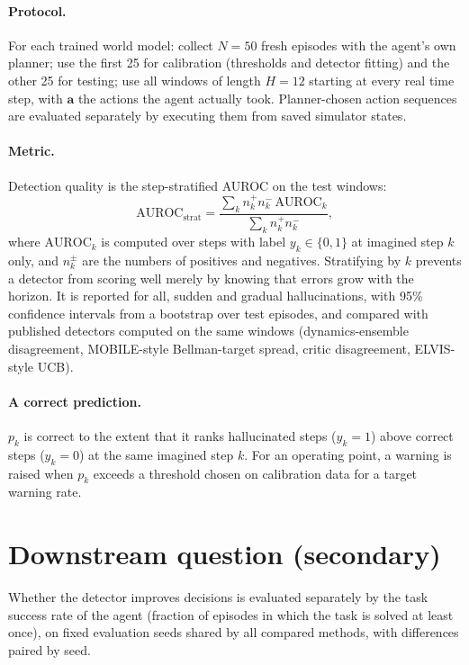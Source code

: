 \documentclass[11pt]{article}
\begin{document}
\paragraph{Protocol.}
For each trained world model: collect $N=50$ fresh episodes with the agent's own planner; use the first 25 for
calibration (thresholds and detector fitting) and the other 25 for testing; use all windows of length $H=12$
starting at every real time step, with $\mathbf a$ the actions the agent actually took. Planner-chosen action
sequences are evaluated separately by executing them from saved simulator states.

\paragraph{Metric.}
Detection quality is the step-stratified AUROC on the test windows:
\[
\text{AUROC}_{\text{strat}}=\frac{\sum_k n^+_k n^-_k\,\text{AUROC}_k}{\sum_k n^+_k n^-_k},
\]
where $\text{AUROC}_k$ is computed over steps with label $y_k\in\{0,1\}$ at imagined step $k$ only, and $n^\pm_k$
are the numbers of positives and negatives. Stratifying by $k$ prevents a detector from scoring well merely by
knowing that errors grow with the horizon. It is reported for all, sudden and gradual hallucinations, with 95\%
confidence intervals from a bootstrap over test episodes, and compared with published detectors computed on the
same windows (dynamics-ensemble disagreement, MOBILE-style Bellman-target spread, critic disagreement,
ELVIS-style UCB).

\paragraph{A correct prediction.}
$p_k$ is correct to the extent that it ranks hallucinated steps ($y_k=1$) above correct steps ($y_k=0$) at the same
imagined step $k$. For an operating point, a warning is raised when $p_k$ exceeds a threshold chosen on calibration
data for a target warning rate.

\section{Downstream question (secondary)}
Whether the detector improves decisions is evaluated separately by the task success rate of the agent (fraction of
episodes in which the task is solved at least once), on fixed evaluation seeds shared by all compared methods,
with differences paired by seed.
\end{document}
